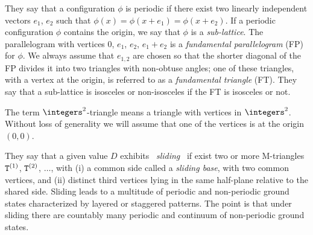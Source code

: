 \begin{description}
{They  say that a configuration $\phi$ is periodic if there exist two
linearly independent vectors $e_1$, $e_2$ such that $\phi (x)=\phi
(x+e_1)=\phi (x+e_2)$. If a periodic configuration $\phi$ contains the
origin, we say that $\phi$ is a {\it sub-lattice}. The parallelogram with
vertices $0$, $e_1$, $e_2$, $e_1+e_2$ is a {\it fundamental
parallelogram} (FP) for $\phi$. We always assume that $e_{1,2}$ are
chosen so that the shorter diagonal of the FP divides it into two
triangles with non-obtuse angles; one of these triangles, with a vertex
at the origin, is referred to as a {\it fundamental triangle} (FT). They
say that a sub-lattice is isosceles or non-isosceles if the FT is
isosceles or not.

The term $\integers^2$-triangle means a triangle with vertices in $\integers^2$.
Without loss of generality we will assume that one of the vertices is at
the origin $(0,0)$.

They say that a given value $D$ exhibits \ {\it sliding} \ if exist  two
or more M-triangles ${\tt T}^{(1)}$, ${\tt T}^{(2)}$, $\ldots$, with (i)
a common side called a {\it sliding base}, with two common vertices, and
(ii) distinct third vertices lying in the same half-plane relative to the
shared side.
Sliding leads to a multitude of periodic and non-periodic ground states
characterized by layered or staggered patterns. The point is that under
sliding there are countably many periodic and continuum of non-periodic
ground states.
    }
\end{description}
